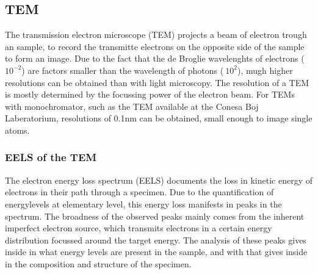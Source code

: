 \subsection{TEM} %
\label{ssub:tem}
The transmission electron microscope (TEM) projects a beam of electron trough an sample, to record the transmitte electrons on the opposite side of the sample to form an image. Due to the fact that the de Broglie wavelenghts of electrons (~$10^{-2}$) are factors smaller than the wavelength of photons ($~10^2$), mugh higher resolutions can be obtained than with light microscopy. \cite{reimer_1989} The resolution of a TEM is mostly determined by the focussing power of the electron beam. For TEMs with monochromator, such as the TEM available at the Conesa Boj Laberatorium, resolutions of 0.1nm can be obtained, small enough to image single atoms. \cite{egerton_article}




\subsubsection{EELS of the TEM}
The electron energy loss spectrum (EELS) documents the loss in kinetic energy of electrons in their path through a specimen. Due to the quantification of energylevels at elementary level, this energy loss manifests in peaks in the spectrum. The broadness of the observed peaks mainly comes from the inherent imperfect electron source, which transmits electrons in a certain energy distribution focussed around the target energy. The analysis of these peaks gives inside in what energy levels are present in the sample, and with that gives inside in the composition and structure of the specimen. \cite{egerton_article}




